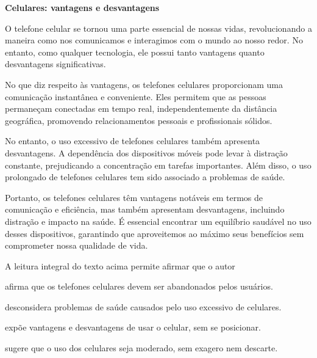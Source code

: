 \begin{myquote}

\textbf{Celulares: vantagens e desvantagens}

O telefone celular se tornou uma parte essencial de nossas vidas,
revolucionando a maneira como nos comunicamos e interagimos com o mundo ao
nosso redor. No entanto, como qualquer tecnologia, ele possui tanto vantagens
quanto desvantagens significativas.

No que diz respeito às vantagens, os telefones celulares proporcionam uma
comunicação instantânea e conveniente. Eles permitem que as pessoas permaneçam
conectadas em tempo real, independentemente da distância geográfica,
promovendo relacionamentos pessoais e profissionais sólidos. 

No entanto, o uso excessivo de telefones celulares também apresenta
desvantagens. A dependência dos dispositivos móveis pode levar à distração
constante, prejudicando a concentração em tarefas importantes. Além disso, o
uso prolongado de telefones celulares tem sido associado a problemas de saúde.

Portanto, os telefones celulares têm vantagens notáveis em termos de
comunicação e eficiência, mas também apresentam desvantagens, incluindo
distração e impacto na saúde. É essencial encontrar um equilíbrio saudável 
no uso desses dispositivos, garantindo que aproveitemos ao máximo seus 
benefícios sem comprometer nossa qualidade de vida.


\end{myquote}

A leitura integral do texto acima permite afirmar que o autor

\begin{escolha}
  
  \item afirma que os telefones celulares devem ser abandonados pelos usuários.
  
  \item desconsidera problemas de saúde causados pelo uso excessivo de celulares.
  
  \item expõe vantagens e desvantagens de usar o celular, sem se posicionar.
  
  \item sugere que o uso dos celulares seja moderado, sem exagero nem descarte.

\end{escolha}

